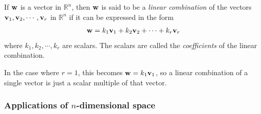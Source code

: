 \documentclass[12pt,letterpaper,reqno]{article}
\numberwithin{equation}{section}
\newcommand{\ti}[1]{\textit{#1}}
\newcommand{\fixme}[1]{{\color{orange}{[#1]}}}
\begin{document}
\begin{defn}
	If ${\bf w}$ is a vector in $\mathbb{R}^n$, then ${\bf w}$ is said to be a \ti{linear combination} of the vectors ${\bf v}_1, {\bf v}_2, \cdots, {\bf v}_r$ in $\mathbb{R}^n$ if it can be expressed in the form
	\begin{align*}
		{\bf w}=k_1{\bf v}_1+k_2{\bf v}_2+\cdots +k_r{\bf v}_r
	\end{align*}
	where $k_1,k_2,\cdots,k_r$ are scalars. The scalars are called the \ti{coefficients} of the linear combination.
	
	In the case where $r=1$, this becomes ${\bf w}=k_1{\bf v}_1$, so a linear combination of a single vector is just a scalar multiple of that vector.
\end{defn}

\subsubsection{Applications of $n$-dimensional space}
\fixme{Finish.}
\end{document}
